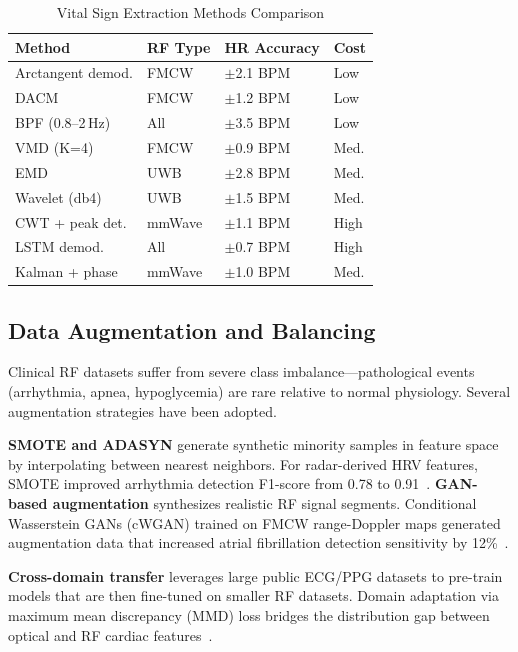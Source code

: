 \documentclass[journal,twoside]{IEEEtran}
\begin{document}
\begin{table}[!t]
\centering
\caption{Vital Sign Extraction Methods Comparison}
\label{tab:vitalsign}
\small
\begin{tabular}{@{}L{1.6cm}L{1.1cm}L{1.7cm}C{0.8cm}@{}}
\toprule
\textbf{Method} & \textbf{RF Type} & \textbf{HR Accuracy} & \textbf{Cost} \\
\midrule
Arctangent demod. & FMCW & $\pm$2.1 BPM & Low \\
DACM & FMCW & $\pm$1.2 BPM & Low \\
BPF (0.8--2\,Hz) & All & $\pm$3.5 BPM & Low \\
VMD (K=4) & FMCW & $\pm$0.9 BPM & Med. \\
EMD & UWB & $\pm$2.8 BPM & Med. \\
Wavelet (db4) & UWB & $\pm$1.5 BPM & Med. \\
CWT + peak det. & mmWave & $\pm$1.1 BPM & High \\
LSTM demod. & All & $\pm$0.7 BPM & High \\
Kalman + phase & mmWave & $\pm$1.0 BPM & Med. \\
\bottomrule
\end{tabular}
\end{table}


\subsection{Data Augmentation and Balancing}

Clinical RF datasets suffer from severe class imbalance---pathological events (arrhythmia, apnea, hypoglycemia) are rare relative to normal physiology. Several augmentation strategies have been adopted.

\textbf{SMOTE and ADASYN} generate synthetic minority samples in feature space by interpolating between nearest neighbors. For radar-derived HRV features, SMOTE improved arrhythmia detection F1-score from 0.78 to 0.91~\cite{ref_mmwave_arrhythmia2023}. \textbf{GAN-based augmentation} synthesizes realistic RF signal segments. Conditional Wasserstein GANs (cWGAN) trained on FMCW range-Doppler maps generated augmentation data that increased atrial fibrillation detection sensitivity by 12\%~\cite{ref_comprehensive_dataset2024}.

\textbf{Cross-domain transfer} leverages large public ECG/PPG datasets to pre-train models that are then fine-tuned on smaller RF datasets. Domain adaptation via maximum mean discrepancy (MMD) loss bridges the distribution gap between optical and RF cardiac features~\cite{ref_biogap2025}.
\end{document}
